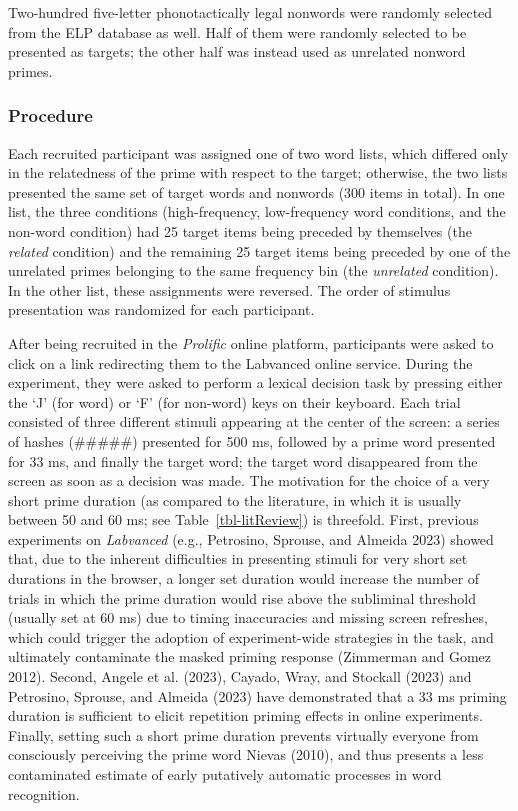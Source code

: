 \documentclass[
]{interact}
\begin{document}
Two-hundred five-letter phonotactically legal nonwords were randomly
selected from the ELP database as well. Half of them were randomly
selected to be presented as targets; the other half was instead used as
unrelated nonword primes.

\subsubsection{Procedure}\label{sec-exp1-methods-proc}

Each recruited participant was assigned one of two word lists, which
differed only in the relatedness of the prime with respect to the
target; otherwise, the two lists presented the same set of target words
and nonwords (300 items in total). In one list, the three conditions
(high-frequency, low-frequency word conditions, and the non-word
condition) had 25 target items being preceded by themselves (the
\emph{related} condition) and the remaining 25 target items being
preceded by one of the unrelated primes belonging to the same frequency
bin (the \emph{unrelated} condition). In the other list, these
assignments were reversed. The order of stimulus presentation was
randomized for each participant.

After being recruited in the \emph{Prolific} online platform,
participants were asked to click on a link redirecting them to the
Labvanced online service. During the experiment, they were asked to
perform a lexical decision task by pressing either the `J' (for word) or
`F' (for non-word) keys on their keyboard. Each trial consisted of three
different stimuli appearing at the center of the screen: a series of
hashes (\#\#\#\#\#) presented for 500 ms, followed by a prime word
presented for 33 ms, and finally the target word; the target word
disappeared from the screen as soon as a decision was made. The
motivation for the choice of a very short prime duration (as compared to
the literature, in which it is usually between 50 and 60 ms; see
Table~\ref{tbl-litReview}) is threefold. First, previous experiments on
\emph{Labvanced} (e.g., Petrosino, Sprouse, and Almeida 2023) showed
that, due to the inherent difficulties in presenting stimuli for very
short set durations in the browser, a longer set duration would increase
the number of trials in which the prime duration would rise above the
subliminal threshold (usually set at 60 ms) due to timing inaccuracies
and missing screen refreshes, which could trigger the adoption of
experiment-wide strategies in the task, and ultimately contaminate the
masked priming response (Zimmerman and Gomez 2012). Second, Angele et
al. (2023), Cayado, Wray, and Stockall (2023) and Petrosino, Sprouse,
and Almeida (2023) have demonstrated that a 33 ms priming duration is
sufficient to elicit repetition priming effects in online experiments.
Finally, setting such a short prime duration prevents virtually everyone
from consciously perceiving the prime word Nievas (2010), and thus
presents a less contaminated estimate of early putatively automatic
processes in word recognition.
\end{document}
